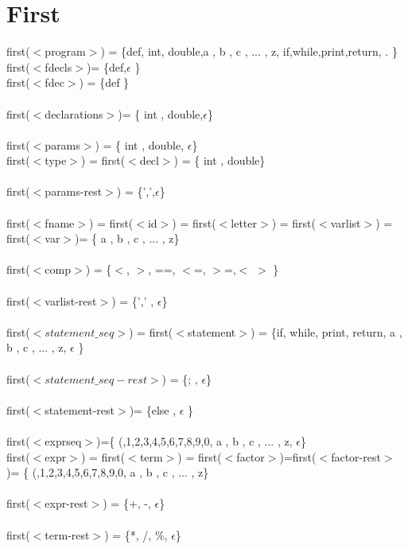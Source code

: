 \documentclass[fleqn]{article}
\begin{document}
\section{First}
first($<$program$>$) =   \{def, int, double,a , b , c , ... , z, if,while,print,return, .  \}\\
first($<$fdecls$>$)=  \{def,$\epsilon$  \}
\\
first($<$fdec$>$) = \{def  \}\\
\\
first($<$declarations$>$)= \{ int , double,$\epsilon$\} \\
\\
first($<$params$>$) = \{ int , double, $\epsilon$\} \\
first($<$type$>$)  = first($<$decl$>$) = \{ int , double\} \\
\\
first($<$params-rest$>$) = \{',',$\epsilon$\}\\
\\
first($<$fname$>$) = first($<$id$>$) = first($<$letter$>$) = first($<$varlist$>$) = first($<$var$>$)=  \{ a , b , c , ... , z\} \\
\\
first($<$comp$>$) = \{$<$, $>$, ==, $<$=, $>$=,$<$ $>$ \}\\
\\
first($<$varlist-rest$>$) = \{',' , $\epsilon$\} \\ 
\\
first($<statement\_ seq>$) = first($<$statement$>$) = \{if, while, print, return, a , b , c , ... , z, $\epsilon$ \}\\
\\
first($<statement\_ seq-rest>$) = \{; , $\epsilon$\}\\
\\
first($<$statement-rest$>$)= \{else , $\epsilon$ \}\\
\\
first($<$exprseq$>$)=\{ (,1,2,3,4,5,6,7,8,9,0, a , b , c , ... , z, $\epsilon$\}\\
first($<$expr$>$) = first($<$term$>$) = first($<$factor$>$)=first($<$factor-rest$>$)= \{ (,1,2,3,4,5,6,7,8,9,0, a , b , c , ... , z\}\\
\\
first($<$expr-rest$>$) = \{+, -,  $\epsilon$\}\\
\\
first($<$term-rest$>$) = \{*, /, $\%$, $\epsilon$\}\\
\\
\end{document}
